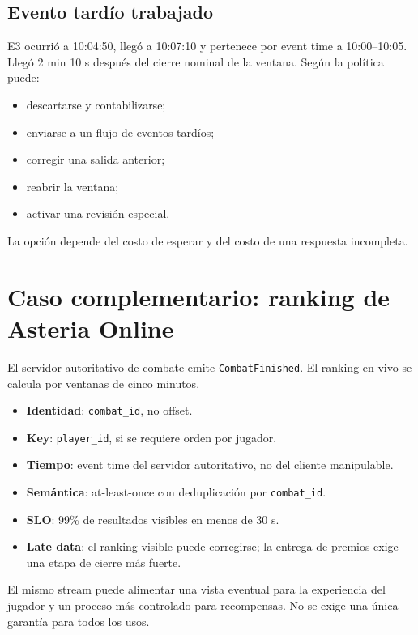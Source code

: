 \documentclass[variant=apuntes,cover=institutional,mode=screen]{ua-engineering-v6-article}
\begin{document}
\subsection{Evento tardío trabajado}

E3 ocurrió a 10:04:50, llegó a 10:07:10 y pertenece por event time a 10:00--10:05. Llegó 2 min 10 s después del cierre nominal de la ventana. Según la política puede:

\begin{itemize}
\item descartarse y contabilizarse;
\item enviarse a un flujo de eventos tardíos;
\item corregir una salida anterior;
\item reabrir la ventana;
\item activar una revisión especial.
\end{itemize}

La opción depende del costo de esperar y del costo de una respuesta incompleta.

\section{Caso complementario: ranking de Asteria Online}

El servidor autoritativo de combate emite \texttt{CombatFinished}. El ranking en vivo se calcula por ventanas de cinco minutos.

\begin{itemize}
\item \textbf{Identidad}: \texttt{combat\_id}, no offset.
\item \textbf{Key}: \texttt{player\_id}, si se requiere orden por jugador.
\item \textbf{Tiempo}: event time del servidor autoritativo, no del cliente manipulable.
\item \textbf{Semántica}: at-least-once con deduplicación por \texttt{combat\_id}.
\item \textbf{SLO}: 99\% de resultados visibles en menos de 30 s.
\item \textbf{Late data}: el ranking visible puede corregirse; la entrega de premios exige una etapa de cierre más fuerte.
\end{itemize}

El mismo stream puede alimentar una vista eventual para la experiencia del jugador y un proceso más controlado para recompensas. No se exige una única garantía para todos los usos.
\end{document}
